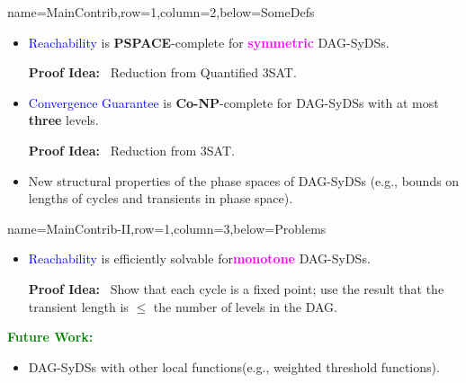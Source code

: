 \documentclass[landscape,a0paper,fontscale=0.285]{baposter} %
\newcommand{\compresslist}{ %
\setlength{\itemsep}{1pt}
\setlength{\parskip}{0pt}
\setlength{\parsep}{0pt}
}
\newcommand{\cpsp}{\mbox{\textbf{PSPACE}}}
\newcommand{\ccnp}{\mbox{\textbf{Co-NP}}}
\begin{document}
\begin{poster}
          {name=MainContrib,row=1,column=2,below=SomeDefs}{
{\small
\begin{itemize}[leftmargin=*,noitemsep,topsep=0pt]\compresslist
\item \textcolor{blue}{Reachability} is \cpsp-complete 
for \textcolor{magenta}{\textbf{symmetric}} DAG-SyDSs.\smallskip

\textbf{Proof Idea:}~ Reduction from Quantified 3SAT.

\item \textcolor{blue}{Convergence Guarantee} is  \ccnp-complete
for DAG-SyDSs with at most \textcolor{dgreen}{\textbf{three}} levels.
\smallskip

\textbf{Proof Idea:}~ Reduction from 3SAT.\smallskip

\item New structural properties of the phase spaces of DAG-SyDSs
(e.g., bounds on lengths of cycles and transients in phase space).
\end{itemize}
}
}


          {name=MainContrib-II,row=1,column=3,below=Problems}{

\begin{itemize}[leftmargin=*,noitemsep,topsep=0pt]\compresslist
\item \textcolor{blue}{Reachability} is  efficiently solvable
for\newline \textcolor{magenta}{\textbf{monotone}} DAG-SyDSs. \smallskip

\textbf{Proof Idea:}~ Show that each cycle is a fixed point; 
use the result that the transient length is $\leq$
the number of levels in the DAG.
\end{itemize}

\medskip

\textcolor{green}{\textbf{Future Work:}} \smallskip

\begin{itemize}[leftmargin=*,noitemsep,topsep=0pt]\compresslist
\item DAG-SyDSs with other
local functions\newline (e.g., weighted threshold functions). %



\end{itemize}}
\end{poster}
\end{document}

